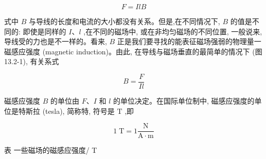 \documentclass[10pt]{article}
\begin{document}
\[
F = {IlB}
\]

式中 \(B\) 与导线的长度和电流的大小都没有关系。但是,在不同情况下, \(B\) 的值是不同的: 即使是同样的 \(I\text{、}l\) ,在不同的磁场中, 或在非均匀磁场的不同位置, 一般说来,导线受的力也是不一样的。看来, \(B\) 正是我们要寻找的能表征磁场强弱的物理量一磁感应强度 (magnetic induction)。由此, 在导线与磁场垂直的最简单的情况下 (图 13.2-1), 有关系式

\[
B = \frac{F}{Il}
\]

磁感应强度 \(B\) 的单位由 \(F\text{、}I\) 和 \(l\) 的单位决定。在国际单位制中, 磁感应强度的单位是特斯拉 (tesla), 简称特, 符号是 \(\mathrm{T}\) ,即

\[
1\mathrm{\;T} = 1\frac{\mathrm{N}}{\mathrm{A} \cdot \mathrm{m}}
\]

表 一些磁场的磁感应强度/ T

\begin{center}
\end{center}
\end{document}
